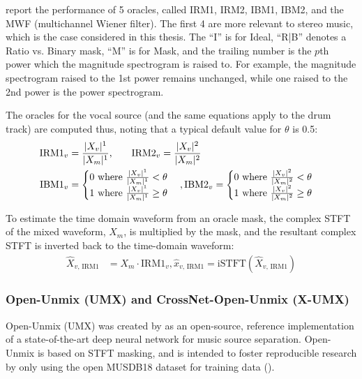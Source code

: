 \documentclass[report.tex]{subfiles}
\begin{document}
\textcite{sisec2018} report the performance of 5 oracles, called IRM1, IRM2, IBM1, IBM2, and the MWF (multichannel Wiener filter). The first 4 are more relevant to stereo music, which is the case considered in this thesis. The ``I'' is for Ideal, ``R|B'' denotes a Ratio vs. Binary mask, ``M'' is for Mask, and the trailing number is the $p$th power which the magnitude spectrogram is raised to. For example, the magnitude spectrogram raised to the 1st power remains unchanged, while one raised to the 2nd power is the power spectrogram.

The oracles for the vocal source (and the same equations apply to the drum track) are computed thus, noting that a typical default value for $\theta$ is 0.5:
\begin{align}
	\nonumber \text{IRM1}_{v} &= \frac{|X_{v}|^{1}}{|X_{m}|^{1}}\text{,\qquad}
	\nonumber \text{IRM2}_{v} = \frac{|X_{v}|^{2}}{|X_{m}|^{2}}\\
	\nonumber \text{IBM1}_{v} &= \begin{cases}
		0 \text{ where } \frac{|X_{v}|^{1}}{|X_{m}|^{1}} < \theta\\
		1 \text{ where } \frac{|X_{v}|^{1}}{|X_{m}|^{1}} \ge \theta
	\end{cases},
	\nonumber \text{IBM2}_{v} = \begin{cases}
		0 \text{ where } \frac{|X_{v}|^{2}}{|X_{m}|^{2}} < \theta\\
		1 \text{ where } \frac{|X_{v}|^{2}}{|X_{m}|^{2}} \ge \theta
	\end{cases}
\end{align}

To estimate the time domain waveform from an oracle mask, the complex STFT of the mixed waveform, $X_{m}$, is multiplied by the mask, and the resultant complex STFT is inverted back to the time-domain waveform:
\begin{align}
	\nonumber \hat{X}_{v\text{, IRM1}} &= X_{m} \cdot \text{IRM1}_{v}, \hat{x}_{v\text{, IRM1}} = \text{iSTFT}(\hat{X}_{v\text{, IRM1}})
\end{align}

\newpagefill

\subsubsection{Open-Unmix (UMX) and CrossNet-Open-Unmix (X-UMX)}
\label{sec:umx}

Open-Unmix (UMX) was created by \textcite{umx} as an open-source, reference implementation of a state-of-the-art deep neural network for music source separation. Open-Unmix is based on STFT masking, and is intended to foster reproducible research by only using the open MUSDB18 dataset for training data (\cite{musdb18, musdb18hq}).
\end{document}
